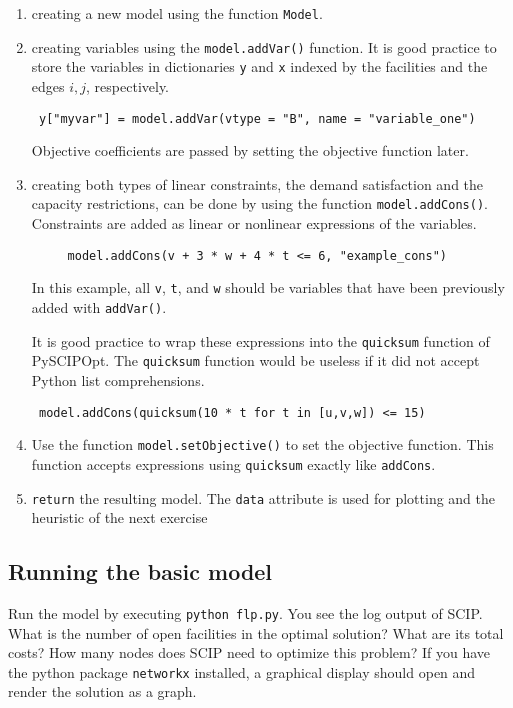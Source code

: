 \documentclass[a4paper,10pt]{article}
\begin{document}
\begin{enumerate}
 \item creating a new model using the function \texttt{Model}.
 \item creating variables using the \texttt{model.addVar()} function. It is good practice to store the variables in dictionaries \texttt{y} and \texttt{x} indexed by the facilities
 and the edges $i,j$, respectively.
\begin{lstlisting}
 y["myvar"] = model.addVar(vtype = "B", name = "variable_one")
\end{lstlisting}
Objective coefficients are passed by setting the objective function later.
 
 \item creating both types of linear constraints, the demand satisfaction and the capacity restrictions, can be done by using the function \texttt{model.addCons()}.
 Constraints are added as linear or nonlinear expressions of the variables.
 \begin{lstlisting}
     model.addCons(v + 3 * w + 4 * t <= 6, "example_cons")
 \end{lstlisting}
 In this example, all \texttt{v}, \texttt{t}, and \texttt{w} should be variables that have been previously added with \texttt{addVar()}.
 
 It is good practice to wrap these expressions
 into the \texttt{quicksum} function of PySCIPOpt.
 The \texttt{quicksum} function would be useless if it did not accept
 Python list comprehensions.
 \begin{lstlisting}
 model.addCons(quicksum(10 * t for t in [u,v,w]) <= 15)
 \end{lstlisting}
 
 \item Use the function \texttt{model.setObjective()} to set the objective function. This function accepts expressions using \texttt{quicksum} exactly like \texttt{addCons}.
 
 \item \texttt{return} the resulting model. The \texttt{data} attribute is used for plotting and the heuristic of the next exercise
\end{enumerate}

\subsection{Running the basic model}

Run the model by executing \texttt{python flp.py}. You see the log output of SCIP. What is the number of open facilities in the optimal solution? What are its total costs? How many nodes does SCIP need to optimize this problem? If you have the python package \texttt{networkx} installed, a graphical display should open and render the solution as a graph.
\end{document}
